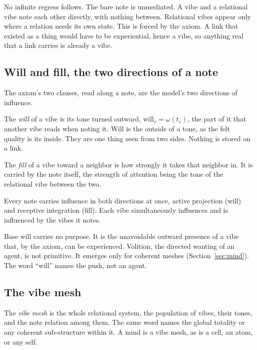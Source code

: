 No infinite regress follows. The bare note is unmediated. A vibe and a relational vibe note each other directly, with nothing between. Relational vibes appear only where a relation needs its own state. This is forced by the axiom. A link that existed as a thing would have to be experiential, hence a vibe, so anything real that a link carries is already a vibe.

\subsection{Will and fill, the two directions of a note}

The axiom's two clauses, read along a note, are the model's two directions of influence.

\begin{definition}[Will]
The \emph{will} of a vibe is its tone turned outward, $\mathrm{will}_v = \omega(t_v)$, the part of it that another vibe reads when noting it. Will is the outside of a tone, as the felt quality is its inside. They are one thing seen from two sides. Nothing is stored on a link.
\end{definition}

\begin{definition}[Fill]
The \emph{fill} of a vibe toward a neighbor is how strongly it takes that neighbor in. It is carried by the note itself, the strength of attention being the tone of the relational vibe between the two.
\end{definition}

\begin{proposition}
Every note carries influence in both directions at once, active projection (will) and receptive integration (fill). Each vibe simultaneously influences and is influenced by the vibes it notes.
\end{proposition}

Base will carries no purpose. It is the unavoidable outward presence of a vibe that, by the axiom, can be experienced. Volition, the directed wanting of an agent, is not primitive. It emerges only for coherent meshes (Section~\ref{sec:mind}). The word ``will'' names the push, not an agent.

\subsection{The vibe mesh}

\begin{definition}
The \emph{vibe mesh} is the whole relational system, the population of vibes, their tones, and the note relation among them. The same word names the global totality or any coherent sub-structure within it. A mind is a vibe mesh, as is a cell, an atom, or any self.
\end{definition}

